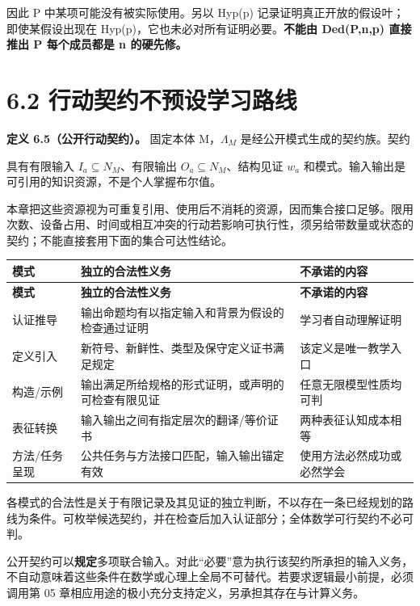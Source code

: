 \documentclass[UTF8,a4paper,zihao=-4,fontset=windows,openany]{ctexbook}
\newcommand{\mcsdisplay}[1]{%
  \par\addvspace{0.7em}%
  \sbox{\mcsmathbox}{\ensuremath{\displaystyle #1}}%
  \ifdim\wd\mcsmathbox>\linewidth
    \noindent\resizebox{\linewidth}{!}{\usebox{\mcsmathbox}}%
  \else
    \noindent\hspace*{\fill}\usebox{\mcsmathbox}\hspace*{\fill}%
  \fi
  \par\addvspace{0.7em}%
}
\def\ensuremath#1{#1}%
\begin{document}
因此 P 中某项可能没有被实际使用。另以 Hyp(p) 记录证明真正开放的假设叶；即使某假设出现在 Hyp(p)，它也未必对所有证明必要。\textbf{不能由 Ded(P,n,p) 直接推出 P 每个成员都是 n 的硬先修。}

\section{6.2 行动契约不预设学习路线}
\textbf{定义 6.5（公开行动契约）。} 固定本体 M，\(\Lambda_M\) 是经公开模式生成的契约族。契约


\mcsdisplay{a=(id_a,I_a,O_a,w_a,mode_a)}
\noindent 具有有限输入 \(I_a\subseteq N_M\)、有限输出 \(O_a\subseteq N_M\)、结构见证 \(w_a\) 和模式。输入输出是可引用的知识资源，不是个人掌握布尔值。

本章把这些资源视为可重复引用、使用后不消耗的资源，因而集合接口足够。限用次数、设备占用、时间或相互冲突的行动若影响可执行性，须另给带数量或状态的契约；不能直接套用下面的集合可达性结论。

\begingroup\small\setlength{\tabcolsep}{4pt}
\begin{longtable}{>{\raggedright\arraybackslash}p{}>{\raggedright\arraybackslash}p{}>{\raggedright\arraybackslash}p{}}
\toprule
\textbf{模式} & \textbf{独立的合法性义务} & \textbf{不承诺的内容} \\
\midrule
\endfirsthead
\toprule
\textbf{模式} & \textbf{独立的合法性义务} & \textbf{不承诺的内容} \\
\midrule
\endhead
\bottomrule
\endfoot
\bottomrule
\endlastfoot
认证推导 & 输出命题均有以指定输入和背景为假设的检查通过证明 & 学习者自动理解证明 \\
定义引入 & 新符号、新鲜性、类型及保守定义证书满足规定 & 该定义是唯一教学入口 \\
构造/示例 & 输出满足所给规格的形式证明，或声明的可检查有限见证 & 任意无限模型性质均可判 \\
表征转换 & 输入输出之间有指定层次的翻译/等价证书 & 两种表征认知成本相等 \\
方法/任务呈现 & 公共任务与方法接口匹配，输入输出锚定有效 & 使用方法必然成功或必然学会 \\
\end{longtable}
\endgroup

各模式的合法性是关于有限记录及其见证的独立判断，不以存在一条已经规划的路线为条件。可枚举候选契约，并在检查后加入认证部分；全体数学可行契约不必可判。

公开契约可以\textbf{规定}多项联合输入。对此“必要”意为执行该契约所承担的输入义务，不自动意味着这些条件在数学或心理上全局不可替代。若要求逻辑最小前提，必须调用第 05 章相应用途的极小充分支持定义，另承担其存在与计算义务。
\end{document}
